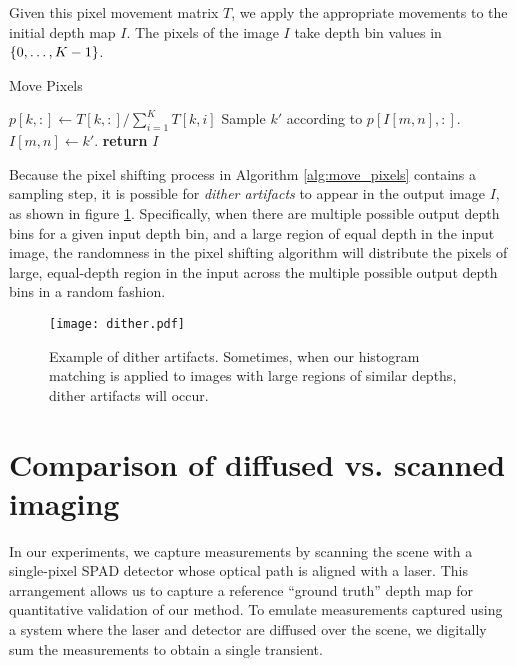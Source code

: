 \documentclass[runningheads]{llncs}
\begin{document}
Given this pixel movement matrix $T$, we apply the appropriate movements to the
initial depth map $I$. The pixels of the image $I$ take depth bin values in $\{0,\ldots,K-1\}$. 
{ \footnotesize
  \begin{algorithm}[H]
    \caption{Move Pixels}
    \label{alg:move_pixels}
    \begin{algorithmic}
      \footnotesize
        \State $p[k,:] \gets T[k,:]/\sum_{i=1}^K T[k,i]$
      \EndFor
          \State Sample $k'$ according to $p[I[m,n],:]$.
          \State $I[m,n] \gets k'$.
        \EndFor
      \EndFor
      \State \textbf{return} $I$
      \EndProcedure
    \end{algorithmic}
  \end{algorithm}
} Because the pixel shifting process in Algorithm \ref{alg:move_pixels} contains
a sampling step, it is possible for
\textit{dither artifacts} to appear in the output image $I$, as shown in figure
\ref{fig:dither}. Specifically, when there are multiple possible output depth
bins for a given input depth bin, and a large region of equal depth in the input
image, the randomness in the pixel shifting algorithm will distribute the pixels
of large, equal-depth region in the input across the multiple possible output
depth bins in a random fashion.

\begin{figure}[H]
  \centering \texttt{[image: dither.pdf]}
  \caption{Example of dither artifacts. Sometimes, when our histogram matching
    is applied to images with large regions of similar depths, dither artifacts
    will occur.}
  \label{fig:dither}
\end{figure}


\section{Comparison of diffused vs. scanned imaging}
In our experiments, we capture measurements by scanning the scene with a
single-pixel SPAD detector whose optical path is aligned with a laser. This
arrangement allows us to capture a reference ``ground truth'' depth map for
quantitative validation of our method. To emulate measurements captured using a
system where the laser and detector are diffused over the scene, we digitally
sum the measurements to obtain a single transient. 
\end{document}
